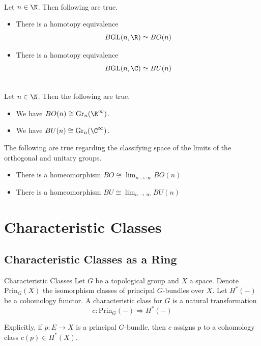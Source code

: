 \documentclass[a4paper]{article}
\begin{document}
\begin{prp}{}{}\\
Let $n\in\N$. Then following are true. 
\begin{itemize}
\item There is a homotopy equivalence $$B\text{GL}(n,\R)\simeq BO(n)$$
\item There is a homotopy equivalence $$B\text{GL}(n,\C)\simeq BU(n)$$
\end{itemize}
\end{prp}

\begin{prp}{}{}\\
Let $n\in\N$. Then the following are true. 
\begin{itemize}
\item We have $BO(n)\cong\text{Gr}_n(\R^\infty)$. 
\item We have $BU(n)\cong\text{Gr}_n(\C^\infty)$. 
\end{itemize}
\end{prp}

\begin{prp}{}{} The following are true regarding the classifying space of the limits of the orthogonal and unitary groups. 
\begin{itemize}
\item There is a homeomorphism $BO\cong\lim_{n\to\infty}BO(n)$
\item There is a homeomorphism $BU\cong\lim_{n\to\infty}BU(n)$
\end{itemize}
\end{prp}


\pagebreak
\section{Characteristic Classes}
\subsection{Characteristic Classes as a Ring}
\begin{defn}{Characteristic Classes}{} Let $G$ be a topological group and $X$ a space. Denote $\text{Prin}_G(X)$ the isomorphism classes of principal $G$-bundles over $X$. Let $H^\ast(-)$ be a cohomology functor. A characteristic class for $G$ is a natural transformation $$c:\text{Prin}_G(-)\Rightarrow H^\ast(-)$$
\end{defn}

Explicitly, if $p:E\to X$ is a principal $G$-bundle, then $c$ assigns $p$ to a cohomology class $c(p)\in H^\ast(X)$. 
\end{document}
